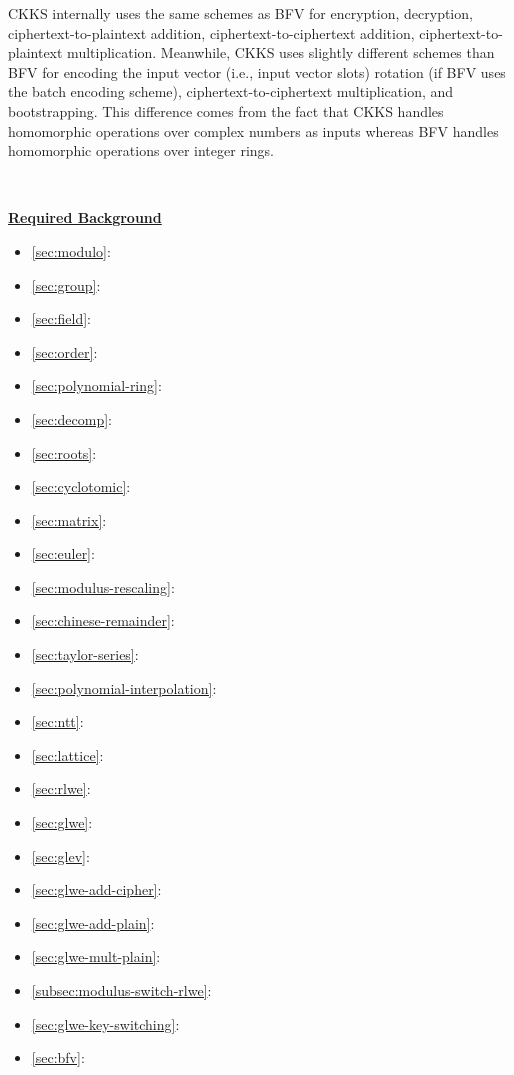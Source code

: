 CKKS internally uses the same schemes as BFV for encryption, decryption, ciphertext-to-plaintext addition, ciphertext-to-ciphertext addition, ciphertext-to-plaintext multiplication. Meanwhile, CKKS uses slightly different schemes than BFV for encoding the input vector (i.e., input vector slots) rotation (if BFV uses the batch encoding scheme), ciphertext-to-ciphertext multiplication, and bootstrapping. This difference comes from the fact that CKKS handles homomorphic operations over complex numbers as inputs whereas BFV handles homomorphic operations over integer rings. 


$ $

\noindent \textbf{\underline{Required Background}}

\begin{itemize}
\item \autoref{sec:modulo}: 
\item \autoref{sec:group}: 
\item \autoref{sec:field}: 
\item \autoref{sec:order}: 
\item \autoref{sec:polynomial-ring}: 
\item \autoref{sec:decomp}: 
\item \autoref{sec:roots}: 
\item \autoref{sec:cyclotomic}: 
\item \autoref{sec:matrix}: 
\item \autoref{sec:euler}: 
\item \autoref{sec:modulus-rescaling}: 
\item \autoref{sec:chinese-remainder}: 
\item \autoref{sec:taylor-series}: 
\item \autoref{sec:polynomial-interpolation}: 
\item \autoref{sec:ntt}: 
\item \autoref{sec:lattice}: 
\item \autoref{sec:rlwe}: 
\item \autoref{sec:glwe}: 
\item \autoref{sec:glev}: 
\item \autoref{sec:glwe-add-cipher}: 
\item \autoref{sec:glwe-add-plain}: 
\item \autoref{sec:glwe-mult-plain}: 
\item \autoref{subsec:modulus-switch-rlwe}: 
\item \autoref{sec:glwe-key-switching}: 
\item \autoref{sec:bfv}: 
\end{itemize}



